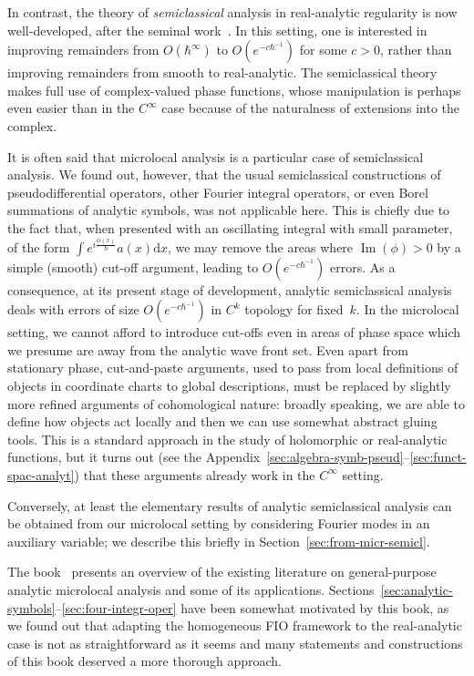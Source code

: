 \documentclass[AHL,Unicode,longabstracts,published]{cedram}
\DeclareMathOperator{\im}{Im}
\newcommand\1{\mathds{1}}
\newcommand{\dd}{\mathrm{d}}
\begin{document}
In contrast, the theory of \emph{semiclassical} analysis in real-analytic regularity is now well-developed, after the seminal work~\cite{sjostrand_singularites_1982}. In this setting, one is interested in improving remainders from $O(\hbar^{\infty})$ to $O(e^{-c\hbar^{-1}})$ for some $c>0$, rather than improving remainders from smooth to real-analytic. The semiclassical theory makes full use of complex-valued phase functions, whose manipulation is perhaps even easier than in the $C^{\infty}$ case because of the naturalness of extensions into the complex.

It is often said that microlocal analysis is a particular case of semiclassical analysis. We found out, however, that the usual semiclassical constructions of pseudodifferential operators, other Fourier integral operators, or even Borel summations of analytic symbols, was not applicable here. This is chiefly due to the fact that, when presented with an oscillating integral with small parameter, of the form $\int e^{i\frac{\phi(x)}{\hbar}}a(x)\dd x$, we may remove the areas where $\im(\phi)>0$ by a simple (smooth) cut-off argument, leading to $O(e^{-c\hbar^{-1}})$ errors. As a consequence, at its present stage of development, analytic semiclassical analysis deals with errors of size $O(e^{-c\hbar^{-1}})$ in $C^{k}$ topology for fixed~$k$. In the microlocal setting, we cannot afford to introduce cut-offs even in areas of phase space which we presume are away from the analytic wave front set. Even apart from stationary phase, cut-and-paste arguments, used to pass from local definitions of objects in coordinate charts to global descriptions, must be replaced by slightly more refined arguments of cohomological nature: broadly speaking, we are able to define how objects act locally and then we can use somewhat abstract gluing tools. This is a standard approach in the study of holomorphic or real-analytic functions, but it turns out (see the Appendix~\ref{sec:algebra-symb-pseud}--\ref{sec:funct-spac-analyt}) that these arguments already work in the $C^{\infty}$ setting.

Conversely, at least the elementary results of analytic semiclassical analysis can be obtained from our microlocal setting by considering Fourier modes in an auxiliary variable; we describe this briefly in Section~\ref{sec:from-micr-semicl}.

The book~\cite{treves_analytic_2022} presents an overview of the existing literature on general-purpose analytic microlocal analysis and some of its applications. Sections~\ref{sec:analytic-symbols}--\ref{sec:four-integr-oper} have been somewhat motivated by this book, as we found out that adapting the homogeneous FIO framework to the real-analytic case is not as straightforward as it seems and many statements and constructions of this book deserved a more thorough approach.
\end{document}
